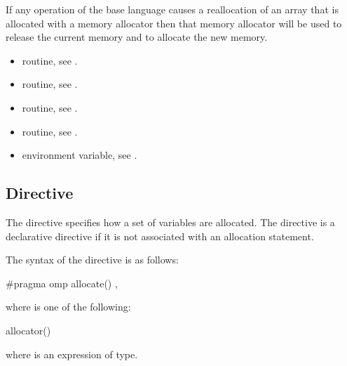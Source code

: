 \begin{fortranspecific}
If any operation of the base language causes a reallocation of an array that is allocated with a memory allocator then that memory allocator will be used to release the current memory and to allocate the new memory.
\end{fortranspecific}

\crossreferences
\begin{itemize}
\item {} routine, see .

\item {} routine, see .

\item {} routine, see .

\item {} routine, see .

\item {} environment variable, see .
\end{itemize}


\subsection{ Directive}
\label{subsec:allocate Directive}
\summary

The  directive specifies how a set of variables are allocated. The  directive is a declarative directive if it is not associated with an allocation statement.

\syntax
\begin{ccppspecific}
The syntax of the  directive is as follows:

\begin{ompcPragma}
#pragma omp allocate() \plc{[clause[ [ [},\plc{] clause] ... ]] new-line}
\end{ompcPragma}

where  is one of the following:

\begin{indentedcodelist}
allocator()
\end{indentedcodelist}

where  is an expression of  type.

\end{ccppspecific}
\medskip

